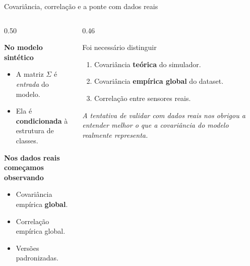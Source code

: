 \documentclass[aspectratio=169, 11pt]{beamer}
\begin{document}
\begin{frame}{Covariância, correlação e a ponte com dados reais}

\begin{columns}[T]
\begin{column}{0.50\textwidth}

\textbf{No modelo sintético}
\begin{itemize}
  \item A matriz $\Sigma$ é \emph{entrada} do modelo.
  \item Ela é \textbf{condicionada} à estrutura de classes.
\end{itemize}

\vspace{0.4em}
\textbf{Nos dados reais começamos observando}
\begin{itemize}
  \item Covariância empírica \textbf{global}.
  \item Correlação empírica global.
  \item Versões padronizadas.
\end{itemize}

\end{column}
\begin{column}{0.46\textwidth}

\begin{block}{Foi necessário distinguir}
\begin{enumerate}
  \item Covariância \textbf{teórica} do simulador.
  \item Covariância \textbf{empírica global} do dataset.
  \item Correlação entre sensores reais.
\end{enumerate}
\end{block}

\vspace{0.3em}
\small\itshape
A tentativa de validar com dados reais nos obrigou a entender melhor o que a covariância do modelo realmente representa.

\end{column}
\end{columns}

\end{frame}
\end{document}
